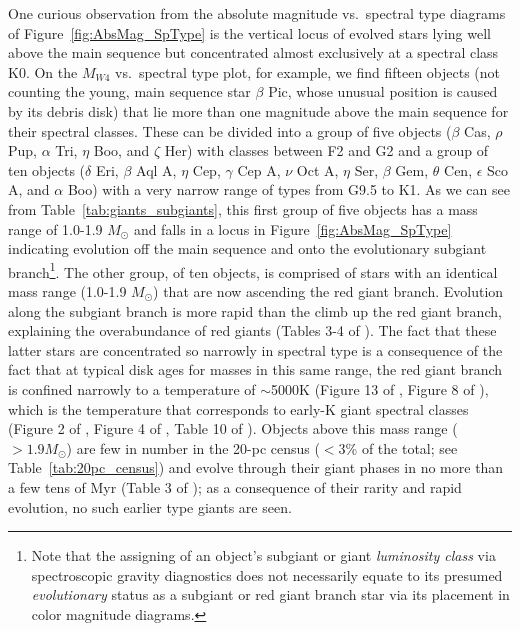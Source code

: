\documentclass[twocolumn,tighten,twocolappendix]{aastex631}
\begin{document}
One curious observation from the absolute magnitude vs.\ spectral type diagrams of Figure~\ref{fig:AbsMag_SpType} is the vertical locus of evolved stars lying well above the main sequence but concentrated almost exclusively at a spectral class K0. On the $M_{W4}$ vs.\ spectral type plot, for example, we find fifteen objects (not counting the young, main sequence star $\beta$ Pic, whose unusual position is caused by its debris disk) that lie more than one magnitude above the main sequence for their spectral classes. These can be divided into a group of five objects ($\beta$ Cas, $\rho$ Pup, $\alpha$ Tri, $\eta$ Boo, and $\zeta$ Her) with classes between F2 and G2 and a group of ten objects ($\delta$ Eri, $\beta$ Aql A, $\eta$ Cep, $\gamma$ Cep A, $\nu$ Oct A, $\eta$ Ser, $\beta$ Gem, $\theta$ Cen, $\epsilon$ Sco A, and $\alpha$ Boo) with a very narrow range of types from G9.5 to K1. As we can see from Table~\ref{tab:giants_subgiants}, this first group of five objects has a mass range of 1.0-1.9 $M_\odot$ and falls in a locus in Figure~\ref{fig:AbsMag_SpType} indicating evolution off the main sequence and onto the evolutionary subgiant branch\footnote{Note that the assigning of an object's  subgiant or giant {\it luminosity class} via spectroscopic gravity diagnostics does not necessarily equate to its presumed {\it evolutionary} status as a subgiant or red giant branch star via its placement in color magnitude diagrams.}. The other group, of ten objects, is comprised of stars with an identical mass range (1.0-1.9 $M_\odot$) that are now ascending the red giant branch. Evolution along the subgiant branch is more rapid than the climb up the red giant branch, explaining the overabundance of red giants (Tables 3-4 of \citealt{iben1967}). The fact that these latter stars are concentrated so narrowly in spectral type is a consequence of the fact that at typical disk ages for masses in this same range, the red giant branch is confined narrowly to a temperature of $\sim$5000K (Figure 13 of \citealt{iben1967}, Figure 8 of \citealt{bressan2012}), which is the temperature that corresponds to early-K giant spectral classes (Figure 2 of \citealt{dyck1996}, Figure 4 of \citealt{richichi1999}, Table 10 of \citealt{heiter2015}). Objects above this mass range ($> 1.9 M_\odot$) are few in number in the 20-pc census ($<$3\% of the total; see Table~\ref{tab:20pc_census}) and evolve through their giant phases in no more than a few tens of Myr (Table 3 of \citealt{iben1967}); as a consequence of their rarity and rapid evolution, no such earlier type giants are seen.
\end{document}
